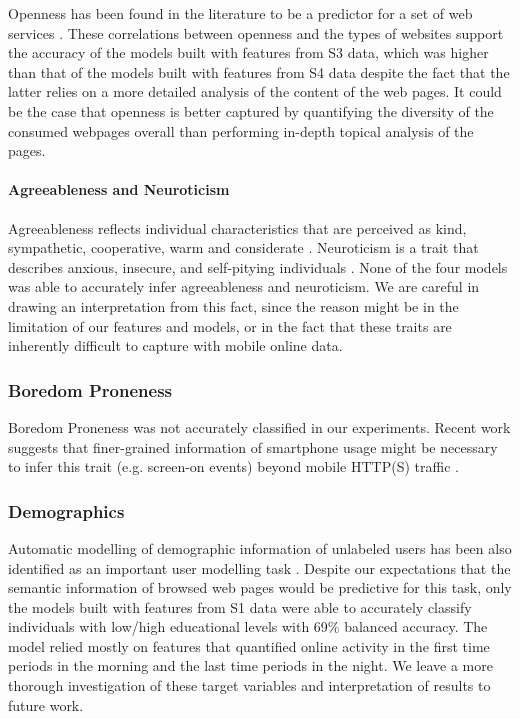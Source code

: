 Openness has been found in the literature to be a predictor for a set of web services \cite{tsao2013big}. These correlations between openness and the types of websites support the accuracy of the models built with features from S3 data, which was higher than that of the models built with features from S4 data despite the fact that the latter relies on a more detailed analysis of the content of the web pages. It could be the case that openness is better captured by quantifying the diversity of the consumed webpages overall than performing in-depth topical analysis of the pages.  

\paragraph{Agreeableness and Neuroticism} Agreeableness reflects individual characteristics that are perceived as kind, sympathetic, cooperative, warm and considerate \cite{goldberg2006international}. Neuroticism is a trait that describes anxious, insecure, and self-pitying individuals \cite{goldberg2006international}. None of the four models was able to accurately infer agreeableness and neuroticism. We are careful in drawing an interpretation from this fact, since the reason might be in the limitation of our features and models, or in the fact that these traits are inherently difficult to capture with mobile online data. 

\subsubsection{Boredom Proneness}
Boredom Proneness was not accurately classified in our experiments. Recent work suggests that finer-grained information of smartphone usage might be necessary to infer this trait (e.g. screen-on events) beyond mobile HTTP(S) traffic \cite{matic2015boredom}.

\subsubsection{Demographics}
Automatic modelling of demographic information of unlabeled users has been also identified as an important user modelling task \cite{koenigstein2011yahoo}. Despite our expectations that the semantic information of browsed web pages would be predictive for this task, only the models built with features from S1 data were able to accurately classify individuals with low/high educational levels with 69\% balanced accuracy. The model relied mostly on features that quantified online activity in the first time periods in the morning and the last time periods in the night. We leave a more thorough investigation of these target variables and interpretation of results to future work. 

